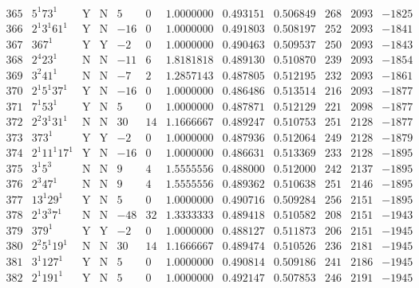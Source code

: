 \documentclass[11pt,reqno,a4letter]{article}
\numberwithin{figure}{section}
\numberwithin{table}{section}
\theoremstyle{plain}
\numberwithin{theorem}{section}
\theoremstyle{definition}
\begin{document}
\begin{table}[h!]
\begin{equation*}
{\begin{array}{cc|cc|ccc|cc|ccc}
 365 & 5^1 73^1 & \text{Y} & \text{N} & 5 & 0 & 1.0000000 & 0.493151 & 0.506849 & 268 & 2093 & -1825 \\
 366 & 2^1 3^1 61^1 & \text{Y} & \text{N} & -16 & 0 & 1.0000000 & 0.491803 & 0.508197 & 252 & 2093 & -1841 \\
 367 & 367^1 & \text{Y} & \text{Y} & -2 & 0 & 1.0000000 & 0.490463 & 0.509537 & 250 & 2093 & -1843 \\
 368 & 2^4 23^1 & \text{N} & \text{N} & -11 & 6 & 1.8181818 & 0.489130 & 0.510870 & 239 & 2093 & -1854 \\
 369 & 3^2 41^1 & \text{N} & \text{N} & -7 & 2 & 1.2857143 & 0.487805 & 0.512195 & 232 & 2093 & -1861 \\
 370 & 2^1 5^1 37^1 & \text{Y} & \text{N} & -16 & 0 & 1.0000000 & 0.486486 & 0.513514 & 216 & 2093 & -1877 \\
 371 & 7^1 53^1 & \text{Y} & \text{N} & 5 & 0 & 1.0000000 & 0.487871 & 0.512129 & 221 & 2098 & -1877 \\
 372 & 2^2 3^1 31^1 & \text{N} & \text{N} & 30 & 14 & 1.1666667 & 0.489247 & 0.510753 & 251 & 2128 & -1877 \\
 373 & 373^1 & \text{Y} & \text{Y} & -2 & 0 & 1.0000000 & 0.487936 & 0.512064 & 249 & 2128 & -1879 \\
 374 & 2^1 11^1 17^1 & \text{Y} & \text{N} & -16 & 0 & 1.0000000 & 0.486631 & 0.513369 & 233 & 2128 & -1895 \\
 375 & 3^1 5^3 & \text{N} & \text{N} & 9 & 4 & 1.5555556 & 0.488000 & 0.512000 & 242 & 2137 & -1895 \\
 376 & 2^3 47^1 & \text{N} & \text{N} & 9 & 4 & 1.5555556 & 0.489362 & 0.510638 & 251 & 2146 & -1895 \\
 377 & 13^1 29^1 & \text{Y} & \text{N} & 5 & 0 & 1.0000000 & 0.490716 & 0.509284 & 256 & 2151 & -1895 \\
 378 & 2^1 3^3 7^1 & \text{N} & \text{N} & -48 & 32 & 1.3333333 & 0.489418 & 0.510582 & 208 & 2151 & -1943 \\
 379 & 379^1 & \text{Y} & \text{Y} & -2 & 0 & 1.0000000 & 0.488127 & 0.511873 & 206 & 2151 & -1945 \\
 380 & 2^2 5^1 19^1 & \text{N} & \text{N} & 30 & 14 & 1.1666667 & 0.489474 & 0.510526 & 236 & 2181 & -1945 \\
 381 & 3^1 127^1 & \text{Y} & \text{N} & 5 & 0 & 1.0000000 & 0.490814 & 0.509186 & 241 & 2186 & -1945 \\
 382 & 2^1 191^1 & \text{Y} & \text{N} & 5 & 0 & 1.0000000 & 0.492147 & 0.507853 & 246 & 2191 & -1945 \\

\end{array}}
\end{equation*}
\end{table}
\end{document}
